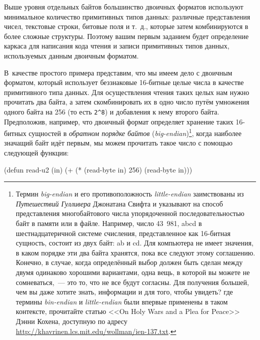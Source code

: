 Выше уровня отдельных байтов большинство двоичных форматов используют минимальное
количество примитивных типов данных: различные представления чисел, текстовые строки,
битовые поля и т.~д., которые затем комбинируются в более сложные структуры. Поэтому
вашим первым заданием будет определение каркаса для написания кода чтения и записи
примитивных типов данных, используемых данным двоичным форматом.

В~качестве простого примера представим, что мы имеем дело с двоичным форматом, который
использует беззнаковые 16-битные целые числа в качестве примитивного типа данных. Для
осуществления чтения таких целых нам нужно прочитать два байта, а затем скомбинировать их
в одно число путём умножения одного байта на 256 (то есть \lstinline!2^8!) и добавления к
нему второго байта. Предположив, например, что двоичный формат определяет хранение таких
16-битных сущностей в \textit{обратном порядке байтов}
(\textit{big-endian})\footnote{Термин \textit{big-endian} и его противоположность
  \textit{little-endian} заимствованы из \textit{Путешествий Гулливера} Джонатана Свифта и
  указывают на способ представления многобайтового числа упорядоченной последовательностью
  байт в памяти или в файле. Например, число 43~981, abcd в шестнадцатеричной системе
  счисления, представленное как 16-битная сущность, состоит из двух байт: ab и cd. Для
  компьютера не имеет значения, в каком порядке эти два байта хранятся, пока все следуют
  этому соглашению. Конечно, в случае, когда определённый выбор должен быть сделан между
  двумя одинаково хорошими вариантами, одна вещь, в которой вы можете не сомневаться,~--- это
  то, что не все будут согласны. Для получения большей, чем вы даже хотите знать,
  информации и для того, чтобы увидеть? где термины \textit{bin-endian} и
  \textit{little-endian} были впервые применены в таком контексте, прочитайте статью <<On
  Holy Wars and a Plea for Peace>> Дэнни Кохена, доступную по адресу
  \url{http://khavrinen.lcs.mit.edu/wollman/ien-137.txt}.}, когда наиболее значащий байт идёт
первым, мы можем прочитать такое число с помощью следующей функции:

\begin{myverb}
(defun read-u2 (in)
  (+ (* (read-byte in) 256) (read-byte in)))
\end{myverb}

